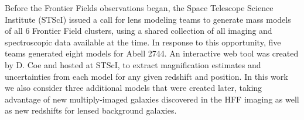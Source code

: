 Before the Frontier Fields observations began, the Space Telescope
Science Institute (STScI) issued a call for lens modeling teams to
generate mass models of all 6 Frontier Field clusters, using a shared
collection of all imaging and spectroscopic data available at the
time.  In response to this opportunity, five teams generated eight
models for Abell 2744.   An interactive
web tool was created by D. Coe and hosted at STScI, to extract
magnification estimates and uncertainties from each model for any
given redshift and position.  In this work we also consider three
additional models that were created later, taking advantage of new
multiply-imaged galaxies discovered in the HFF imaging as well as new
redshifts for lensed background galaxies.



